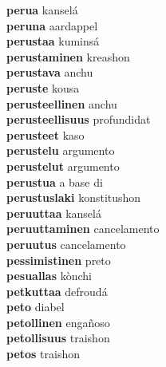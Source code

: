 \textbf{perua } kanselá \\
\textbf{peruna } aardappel \\
\textbf{perustaa } kuminsá \\
\textbf{perustaminen } kreashon \\
\textbf{perustava } anchu \\
\textbf{peruste } kousa \\
\textbf{perusteellinen } anchu \\
\textbf{perusteellisuus } profundidat \\
\textbf{perusteet } kaso \\
\textbf{perustelu } argumento \\
\textbf{perustelut } argumento \\
\textbf{perustua } a base di \\
\textbf{perustuslaki } konstitushon \\
\textbf{peruuttaa } kanselá \\
\textbf{peruuttaminen } cancelamento \\
\textbf{peruutus } cancelamento \\
\textbf{pessimistinen } preto \\
\textbf{pesuallas } kònchi \\
\textbf{petkuttaa } defroudá \\
\textbf{peto } diabel \\
\textbf{petollinen } engañoso \\
\textbf{petollisuus } traishon \\
\textbf{petos } traishon \\
